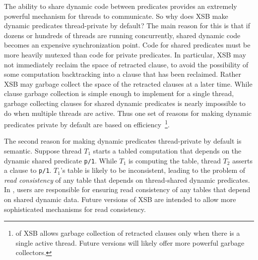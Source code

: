The ability to share dynamic code between predicates provides an
extremely powerful mechanism for threads to communicate.  So why does
XSB make dynamic predicates thread-private by default?  The main
reason for this is that if dozens or hundreds of threads are running
concurrently, shared dynamic code becomes an expensive synchronization
point.  Code for shared predicates must be more heavily mutexed than
code for private predicates.  In particular, XSB may not immediately
reclaim the space of retracted clause, to avoid the possibility of
some computation backtracking into a clause that has been reclaimed.
Rather XSB may garbage collect the space of the retracted clauses at a
later time.  While clause garbage collection is simple enough to
implement for a single thread, garbage collecting clauses for shared
dynamic predicates is nearly impossible to do when multiple threads
are active.  Thus one set of reasons for making dynamic predicates
private by default are based on efficiency~\footnote{\version{} of XSB
  allows garbage collection of retracted clauses only when there is a
  single active thread.  Future versions will likely offer more
  powerful garbage collectors.}.

The second reason for making dynamic predicates thread-private by
default is semantic.  Suppose thread $T_1$ starts a tabled computation
that depends on the dynamic shared predicate {\tt p/1}.  While $T_1$
is computing the table, thread $T_2$ asserts a clause to {\tt p/1}.
$T_1$'s table is likely to be inconsistent, leading to the problem of
{\em read consistency} of any table that depends on thread-shared
dynamic predicates.  In \version , users are responsible for ensuring
read consistency of any tables that depend on shared dynamic data.
Future versions of XSB are intended to allow more sophisticated
mechanisms for read consistency.

